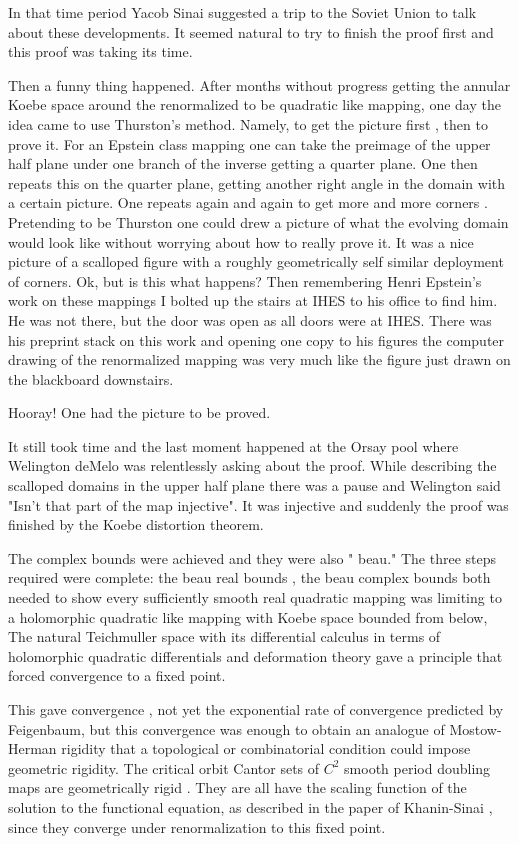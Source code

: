 \begin{description}
 In that time period  Yacob Sinai  suggested  a trip to the  Soviet  Union to talk about these developments. It seemed natural to try to  finish the proof first and this proof was taking its time.

 Then a  funny thing  happened. After months  without progress  getting  the annular  Koebe space around the renormalized to be quadratic like mapping, one day the idea came to use Thurston's method.  Namely, to get the picture  first , then to prove it.  For an  Epstein class mapping one  can take  the preimage of the upper half plane under one branch of the inverse getting a quarter plane. One then repeats this on the quarter plane, getting another right angle in the domain with a certain picture. One repeats again and again to get  more and more  corners . Pretending to be Thurston  one could  drew a picture of what the evolving domain would look like without worrying about how to really prove it. It was a nice picture of a scalloped figure with a roughly geometrically self similar  deployment of corners. Ok, but is this what happens?
Then remembering  Henri Epstein's work  on these mappings  I  bolted up the stairs at IHES to his office to find him. He was not there, but the door was open as all doors were at IHES. There  was his preprint stack on this work  and  opening  one copy to  his  figures the computer drawing of the renormalized mapping  was very much like the figure just drawn on the blackboard downstairs.

Hooray! One had the  picture to be proved.

It  still took time  and  the last  moment  happened at the Orsay pool where Welington deMelo was relentlessly  asking   about the proof.  While describing  the scalloped  domains in the upper half plane  there was a pause and Welington said "Isn't that part of the  map injective".  It was injective and suddenly the proof was finished by the Koebe distortion theorem.

The complex bounds were achieved and they were also " beau."  The three steps required were complete: the beau real bounds , the beau complex bounds  both needed to show every sufficiently smooth  real quadratic mapping was limiting to  a holomorphic quadratic like mapping with Koebe space bounded from below, The natural Teichmuller space with its differential calculus in terms of holomorphic quadratic differentials and deformation theory gave a principle that forced convergence to a fixed point.

This gave convergence ,  not  yet the  exponential rate of convergence  predicted by Feigenbaum,   but this convergence  was enough to obtain   an  analogue of Mostow-Herman rigidity that a topological or combinatorial condition could impose geometric rigidity.
 The critical orbit Cantor sets  of $C^2$ smooth period doubling maps are  geometrically rigid . They are  all  have  the scaling function of the solution to the functional equation,  as described in the paper of Khanin-Sinai , since they converge under renormalization to this fixed point.





\end{description}
